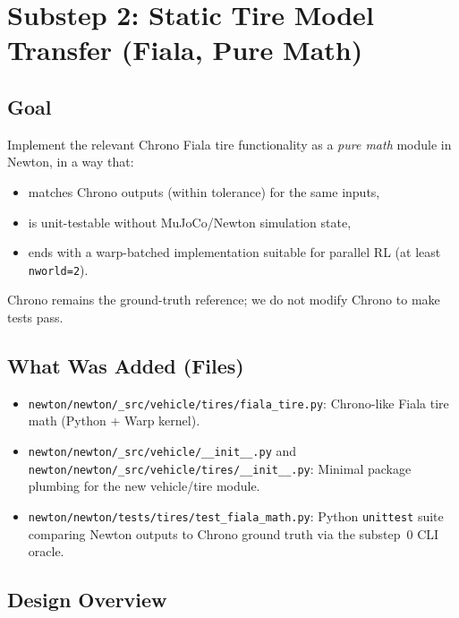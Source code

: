 %
%
\section{Substep 2: Static Tire Model Transfer (Fiala, Pure Math)}
\label{sec:substep2-static-fiala}

\subsection{Goal}
Implement the relevant Chrono Fiala tire functionality as a \emph{pure math} module in Newton, in a way that:
\begin{itemize}
  \item matches Chrono outputs (within tolerance) for the same inputs,
  \item is unit-testable without MuJoCo/Newton simulation state,
  \item ends with a warp-batched implementation suitable for parallel RL (at least \texttt{nworld=2}).
\end{itemize}
Chrono remains the ground-truth reference; we do not modify Chrono to make tests pass.

\subsection{What Was Added (Files)}
\begin{itemize}
  \item \texttt{newton/newton/\_src/vehicle/tires/fiala\_tire.py}:
    Chrono-like Fiala tire math (Python + Warp kernel).
  \item \texttt{newton/newton/\_src/vehicle/\_\_init\_\_.py} and
        \texttt{newton/newton/\_src/vehicle/tires/\_\_init\_\_.py}:
    Minimal package plumbing for the new vehicle/tire module.
  \item \texttt{newton/newton/tests/tires/test\_fiala\_math.py}:
    Python \texttt{unittest} suite comparing Newton outputs to Chrono ground truth via the substep~0 CLI oracle.
\end{itemize}

\subsection{Design Overview}
